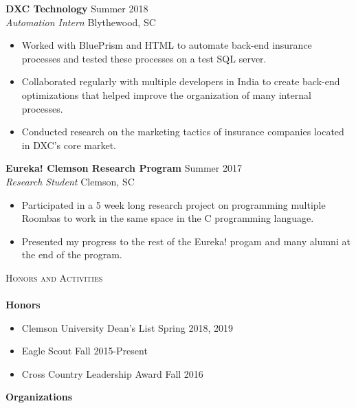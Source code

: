 \documentclass[a4paper]{article}
\newcommand{\lineunder} {
    \vspace*{-8pt} \\
    \hspace*{-18pt} \hrulefill \\
}
\newcommand{\header} [1] {
    {\hspace*{-18pt}\vspace*{6pt} \textsc{#1}}
    \vspace*{-6pt} \lineunder
}
\newcommand{\beginninglist} [4] {
	
	\noindent \textbf{#1} \hfill \hfill #3\\ \noindent \textit{#2} \hfill \hfill #4 \\    
}
\begin{document}
\beginninglist {DXC Technology} {Automation Intern} {Summer 2018} {Blythewood, SC} \vspace{-8pt}
\begin{itemize}
	\item Worked with BluePrism and HTML to automate back-end insurance processes and tested these processes on a test SQL server.\vspace{-5pt}
	\item Collaborated regularly with multiple developers in India to create back-end optimizations that helped improve the organization of many internal processes.\vspace{-5pt}
	\item Conducted research on the marketing tactics of insurance companies located in DXC's core market.\vspace{-5pt}
\end{itemize}

\beginninglist {Eureka! Clemson Research Program} {Research Student} {Summer 2017} {Clemson, SC}
\vspace{-8pt}
\begin{itemize}
	\item Participated in a 5 week long research project on programming multiple Roombas to work in the same space in the C programming language.  \vspace{-5pt}
	\item Presented my progress to the rest of the Eureka! progam and many alumni at the end of the program. \vspace{-5pt}
\end{itemize}

\header {Honors and Activities}

\textbf{Honors}

\begin{itemize}
\vspace{-10pt}
\item Clemson University Dean's List \hfill \hfill Spring 2018, 2019 \vspace{-5pt} 
\item Eagle Scout \hfill \hfill Fall 2015-Present \vspace{-5pt}
\item Cross Country Leadership Award \hfill \hfill Fall 2016 \vspace{-5pt}
\end{itemize}

\textbf{Organizations} \vspace{-5pt}
\end{document}
